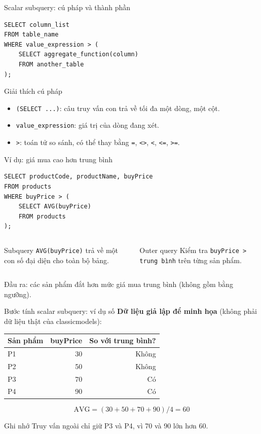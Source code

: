 \documentclass[aspectratio=169,10pt]{beamer}
\newcommand{\code}[1]{\texttt{#1}}
\begin{document}
\begin{frame}[fragile]{Scalar subquery: cú pháp và thành phần}
\begin{lstlisting}
SELECT column_list
FROM table_name
WHERE value_expression > (
    SELECT aggregate_function(column)
    FROM another_table
);
\end{lstlisting}
\begin{block}{Giải thích cú pháp}
\begin{itemize}
\item \code{(SELECT ...)}: câu truy vấn con trả về tối đa một dòng, một cột.
\item \code{value\_expression}: giá trị của dòng đang xét.
\item \code{>}: toán tử so sánh, có thể thay bằng \code{=}, \code{<>}, \code{<}, \code{<=}, \code{>=}.
\end{itemize}
\end{block}
\end{frame}

\begin{frame}[fragile]{Ví dụ: giá mua cao hơn trung bình}
\begin{lstlisting}
SELECT productCode, productName, buyPrice
FROM products
WHERE buyPrice > (
    SELECT AVG(buyPrice)
    FROM products
);
\end{lstlisting}
\begin{columns}[T,onlytextwidth]
\begin{block}{Subquery}
\code{AVG(buyPrice)} trả về một con số đại diện cho toàn bộ bảng.
\end{block}
\begin{block}{Outer query}
Kiểm tra \code{buyPrice > trung bình} trên từng sản phẩm.
\end{block}
\end{columns}
\small Đầu ra: các sản phẩm đắt hơn mức giá mua trung bình (không gồm bằng ngưỡng).
\end{frame}

\begin{frame}[fragile]{Bước tính scalar subquery: ví dụ số}
\small \textbf{Dữ liệu giả lập để minh họa} (không phải dữ liệu thật của classicmodels):
\begin{center}
\begin{tabular}{lrr}\toprule
Sản phẩm & buyPrice & So với trung bình?\\\midrule
P1 & 30 & Không\\
P2 & 50 & Không\\
P3 & 70 & Có\\
P4 & 90 & Có\\\bottomrule
\end{tabular}
\end{center}
\[\mathrm{AVG}=(30+50+70+90)/4=60\]
\begin{block}{Ghi nhớ}
\small Truy vấn ngoài chỉ giữ P3 và P4, vì 70 và 90 lớn hơn 60.
\end{block}
\end{frame}
\end{document}
